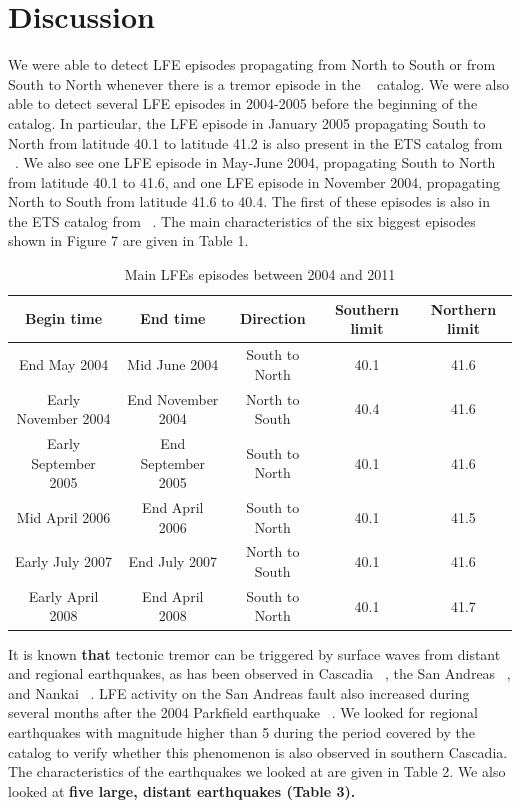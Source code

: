 \documentclass[draft]{agujournal2019}
\begin{document}
\section{Discussion}

We were able to detect LFE episodes propagating from North to South or from South to North whenever there is a tremor episode in the ~ catalog. We were also able to detect several LFE episodes in 2004-2005 before the beginning of the ~ catalog. In particular, the LFE episode in January 2005 propagating South to North from latitude 40.1 to latitude 41.2 is also present in the ETS catalog from ~. We also see one LFE episode in May-June 2004, propagating South to North from latitude 40.1 to 41.6, and one LFE episode in November 2004, propagating North to South from latitude 41.6 to 40.4. The first of these episodes is also in the ETS catalog from ~. The main characteristics of the six biggest episodes shown in Figure 7 are given in Table 1. \\

\begin{table}
\caption{Main LFEs episodes between 2004 and 2011}
\centering
\begin{tabular}{c c c c c}
\hline
Begin time & End time & Direction & Southern limit & Northern limit \\
\hline
End May 2004 & Mid June 2004 & South to North & 40.1 & 41.6 \\
Early November 2004 & End November 2004 & North to South & 40.4 & 41.6 \\
Early September 2005 & End September 2005 & South to North & 40.1 & 41.6 \\
Mid April 2006 & End April 2006 & South to North & 40.1 & 41.5 \\
Early July 2007 & End July 2007 & North to South & 40.1 & 41.6 \\
Early April 2008 & End April 2008 & South to North & 40.1 & 41.7 \\
\hline
\end{tabular}
\end{table}

It is known \textbf{that} tectonic tremor can be triggered by surface waves from distant and regional earthquakes, as has been observed in Cascadia ~\cite{RUB_2009}, the San Andreas ~\cite{PEN_2009, GUI_2010}, and Nankai ~\cite{MIY_2008,HAN_2014}. LFE activity on the San Andreas fault also increased during several months after the 2004 Parkfield earthquake ~\cite{SHE_2017}. We looked for regional earthquakes with magnitude higher than 5 during the period covered by the catalog to verify whether this phenomenon is also observed in southern Cascadia. The characteristics of the earthquakes we looked at are given in Table 2. We also looked at \textbf{five large, distant earthquakes (Table 3).} \\
\end{document}
